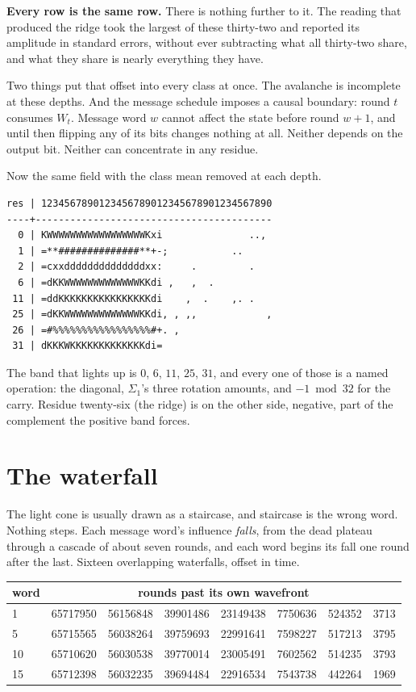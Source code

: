 \textbf{Every row is the same row.} There is nothing further to it. The reading that produced the ridge
took the largest of these thirty-two and reported its amplitude in standard errors, without ever
subtracting what all thirty-two share, and what they share is nearly everything they have.

Two things put that offset into every class at once. The avalanche is incomplete at these depths.
And the message schedule imposes a causal boundary: round \(t\) consumes \(W_t\). Message word
\(w\) cannot affect the state before round \(w+1\), and until then flipping any of its bits changes
nothing at all. Neither depends on the output bit. Neither can concentrate in any residue.

Now the same field with the class mean removed at each depth.

\begin{verbatim}
res | 1234567890123456789012345678901234567890
----+-----------------------------------------
  0 | KWWWWWWWWWWWWWWWWWKxi               ..,
  1 | =**##############**+-;           ..
  2 | =cxxddddddddddddddxx:     .         .
  6 | =dKKWWWWWWWWWWWWWKKdi ,   ,  .
 11 | =ddKKKKKKKKKKKKKKKKdi    ,  .    ,. .
 25 | =dKKWWWWWWWWWWWWWKKdi, , ,,            ,
 26 | =#%%%%%%%%%%%%%%%%%#+. ,
 31 | dKKKWKKKKKKKKKKKKKdi=
\end{verbatim}

The band that lights up is \(0\), \(6\), \(11\), \(25\), \(31\), and every one of those is a named
operation: the diagonal, \(\Sigma_1\)'s three rotation amounts, and \(-1 \bmod 32\) for the
carry. Residue twenty-six (the ridge) is on the other side, negative, part of the complement
the positive band forces.

\section{The waterfall}

The light cone is usually drawn as a staircase, and staircase is the wrong word. Nothing steps. Each
message word's influence \emph{falls}, from the dead plateau through a cascade of about seven
rounds, and each word begins its fall one round after the last. Sixteen overlapping waterfalls,
offset in time.

\begin{center}
\begin{tabular}{lrrrrrrr}
\toprule
word & \multicolumn{7}{c}{rounds past its own wavefront} \\
\midrule
1 & 65717950 & 56156848 & 39901486 & 23149438 & 7750636 & 524352 & 3713 \\
5 & 65715565 & 56038264 & 39759693 & 22991641 & 7598227 & 517213 & 3795 \\
10 & 65710620 & 56030538 & 39770014 & 23005491 & 7602562 & 514235 & 3793 \\
15 & 65712398 & 56032235 & 39694484 & 22916534 & 7543738 & 442264 & 1969 \\
\bottomrule
\end{tabular}
\end{center}

